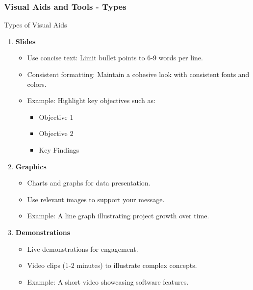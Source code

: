 \documentclass{beamer}
\begin{document}
\begin{frame}[fragile]
    \frametitle{Visual Aids and Tools - Types}
    \begin{block}{Types of Visual Aids}
        \begin{enumerate}
            \item \textbf{Slides}
                \begin{itemize}
                    \item Use concise text: Limit bullet points to 6-9 words per line.
                    \item Consistent formatting: Maintain a cohesive look with consistent fonts and colors.
                    \item Example: Highlight key objectives such as:
                        \begin{itemize}
                            \item Objective 1
                            \item Objective 2
                            \item Key Findings
                        \end{itemize}
                \end{itemize}
            
            \item \textbf{Graphics}
                \begin{itemize}
                    \item Charts and graphs for data presentation.
                    \item Use relevant images to support your message.
                    \item Example: A line graph illustrating project growth over time.
                \end{itemize}
            
            \item \textbf{Demonstrations}
                \begin{itemize}
                    \item Live demonstrations for engagement.
                    \item Video clips (1-2 minutes) to illustrate complex concepts.
                    \item Example: A short video showcasing software features.
                \end{itemize}
        \end{enumerate}
    \end{block}
\end{frame}
\end{document}
